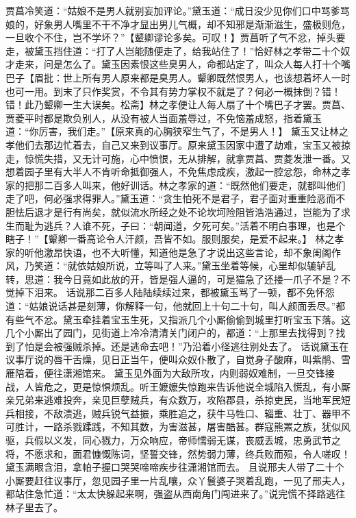 \documentclass[12pt,oneside]{book}
\begin{document}
贾菖冷笑道：“姑娘不是男人就别妄加评论。”黛玉道：“成日没少见你们口中骂爹骂娘的，好象男人嘴里不干不净才显出男儿气概，却不知邪是渐渐滋生，盛极则危，一旦收个不住，岂不学坏？”【颦卿谬论多矣。可叹！】贾菖听了气不忿，掉头要走，被黛玉挡住道：“打了人岂能随便走了，给我站住了！”恰好林之孝带二十个奴才走来，问是怎么了。黛玉因素恨这些臭男人，命都站定了，叫众人每人打十个嘴巴子【眉批：世上所有男人原来都是臭男人。颦卿既然恨男人，也该想着坏人一时也可一用。到末了只作奖赏，不令其有势力掌权不就是了？何必一概抹倒？错！错！此乃颦卿一生大误矣。松斋】林之孝便让人每人扇了十个嘴巴子才罢。贾菖、贾菱平时都是欺负别人，从没有被人当面羞辱过，不免恼羞成怒，指着黛玉道：“你厉害，我们走。”【原来真的心胸狭窄生气了，不是男人！】
黛玉又让林之孝他们去那边忙着去，自己又来到议事厅。原来黛玉因家中遭了劫难，宝玉又被掠走，惊慌失措，又无计可施，心中愤恨，无从排解，就拿贾菖、贾菱发泄一番。又想着园子里有大半人不肯听命抵御强人，不免焦虑成疾，激起一腔忿怨，命林之孝家的把那二百多人叫来，他好训话。林之孝家的道：“既然他们要走，就都叫他们走了吧，何必强求得罪人。”黛玉道：“贪生怕死不是君子，君子面对重重险恶而不胆怯后退才是行有尚矣，就似流水所经之处不论坎坷险阻皆浩浩通过，岂能为了求生而耻为逃兵？人谁不死，子曰：“朝闻道，夕死可矣。”活着不明白事理，也是个瞎子！”【颦卿一番高论令人汗颜，吾皆不如。服则服矣，是爱不起来。】
林之孝家的听他激昂快语，也不大听懂，知道他是急了才说出这些言论，却不象闺阁作风，乃笑道：“就依姑娘所说，立等叫了人来。”黛玉坐着等候，心里却似辘轳乱转，思道：我今日竟如此放的开，皆是强人逼的，可是猫急了还搂一爪子不是？不觉掉下泪来。
话说那二百多人陆陆续续过来，都被黛玉骂了一顿，都不免怀怨道：“姑娘说话甚是刻薄，你解释一句，他就回上十句二十句，叫人颜面丢尽。”都有些气不忿。黛玉牵挂着宝玉生死，又指派几个小厮偷偷到城里打听宝玉下落。这几个小厮出了园门，见街道上冷冷清清关门闭户的，都道：“上那里去找得到？找到了怕是会被强贼杀掉。还是逃命去吧！”乃沿着小径逃往别处去了。
话说黛玉在议事厅说的唇干舌燥，见日正当午，便叫众奴仆散了，自觉身子酸麻，叫紫鹃、雪雁陪着，便往潇湘馆来。
黛玉见外面为大敌所攻，内则弱奴难制，一旦交锋接战，人皆危之，更是惊惧烦乱。听王嬷嬷失惊跑来告诉他说全城陷入慌乱，有小厮亲兄弟来逃难投奔，亲见巨孽贼兵，有众数万，攻陷郡县，杀掠吏民，当地军民短兵相接，不敌溃逃，贼兵锐气益振，乘胜追之，获牛马牲口、辎重、壮丁、器甲不可胜计，一路杀戮蹂践，不知其数，为害滋甚，屠害酷甚。群寇熊罴之族，犹似风驱，兵假以义发，同心戮力，万众响应，帝师懦弱无谋，丧威丢城，忠勇武节之将，不愿求和，面君慷慨陈词，坚誓交锋，然势弱力薄，终兵败而殒，令人嗟叹！黛玉满眼含泪，拿帕子握口哭哭啼啼疾步往潇湘馆而去。
且说邢夫人带了二十个小厮要赶往议事厅，忽见园子里一片乱嚷，众丫鬟婆子哭着乱跑，一见了邢夫人，都站住急忙道：“太太快躲起来啊，强盗从西南角门闯进来了。”说完慌不择路逃往林子里去了。
\end{document}
